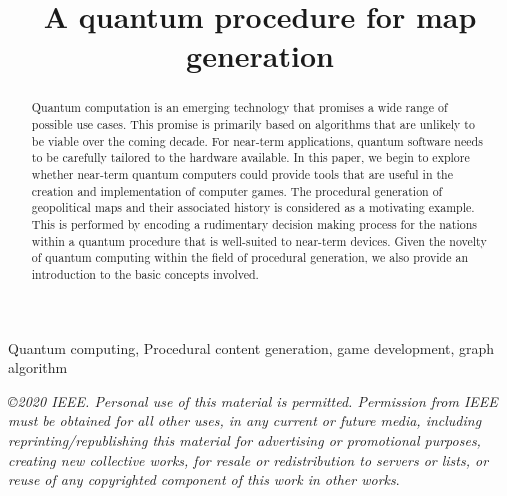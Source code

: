 \documentclass[conference]{IEEEtran}
\begin{document}
\title{A quantum procedure for map generation}



\author{
}


\maketitle

\begin{abstract}

Quantum computation is an emerging technology that promises a wide range of possible use cases. This promise is primarily based on algorithms that are unlikely to be viable over the coming decade. For near-term applications, quantum software needs to be carefully tailored to the hardware available. In this paper, we begin to explore whether near-term quantum computers could provide tools that are useful in the creation and implementation of computer games. The procedural generation of geopolitical maps and their associated history is considered as a motivating example. This is performed by encoding a rudimentary decision making process for the nations within a quantum procedure that is well-suited to near-term devices. Given the novelty of quantum computing within the field of procedural generation, we also provide an introduction to the basic concepts involved.

\end{abstract}

\begin{IEEEkeywords}
Quantum computing, Procedural content generation, game development, graph algorithm
\end{IEEEkeywords}

\emph{\copyright 2020 IEEE.  Personal use of this material is permitted.  Permission from IEEE must be obtained for all other uses, in any current or future media, including reprinting/republishing this material for advertising or promotional purposes, creating new collective works, for resale or redistribution to servers or lists, or reuse of any copyrighted component of this work in other works}.
\end{document}
